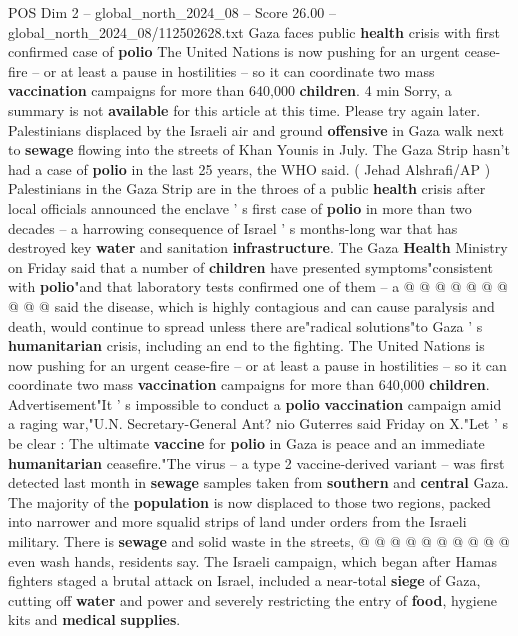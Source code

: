 \begin{textsample}{POS Dim 2 – global\_north\_2024\_08 – Score 26.00 – global\_north\_2024\_08/112502628.txt}  \label{ex:f2_pos_398}
Gaza faces public \textbf{health} crisis with first confirmed case of \textbf{polio} The United Nations is now pushing for an urgent cease-fire -- or at least a pause in hostilities -- so it can coordinate two mass \textbf{vaccination} campaigns for more than 640,000 \textbf{children}. 4 min Sorry, a summary is not \textbf{available} for this article at this time.
Please try again later.
Palestinians displaced by the Israeli air and ground \textbf{offensive} in Gaza walk next to \textbf{sewage} flowing into the streets of Khan Younis in July.
The Gaza Strip hasn't had a case of \textbf{polio} in the last 25 years, the WHO said. ( Jehad Alshrafi/AP ) Palestinians in the Gaza Strip are in the throes of a public \textbf{health} crisis after local officials announced the enclave ' s first case of \textbf{polio} in more than two decades -- a harrowing consequence of Israel ' s months-long war that has destroyed key \textbf{water} and sanitation \textbf{infrastructure}.
The Gaza \textbf{Health} Ministry on Friday said that a number of \textbf{children} have presented symptoms"consistent with \textbf{polio}"and that laboratory tests confirmed one of them -- a @ @ @ @ @ @ @ @ @ @ said the disease, which is highly contagious and can cause paralysis and death, would continue to spread unless there are"radical solutions"to Gaza ' s \textbf{humanitarian} crisis, including an end to the fighting.
The United Nations is now pushing for an urgent cease-fire -- or at least a pause in hostilities -- so it can coordinate two mass \textbf{vaccination} campaigns for more than 640,000 \textbf{children}.
Advertisement"It ' s impossible to conduct a \textbf{polio} \textbf{vaccination} campaign amid a raging war,"U.N.
Secretary-General Ant? nio Guterres said Friday on X."Let ' s be clear : The ultimate \textbf{vaccine} for \textbf{polio} in Gaza is peace and an immediate \textbf{humanitarian} ceasefire."The virus -- a type 2 vaccine-derived variant -- was first detected last month in \textbf{sewage} samples taken from \textbf{southern} and \textbf{central} Gaza.
The majority of the \textbf{population} is now displaced to those two regions, packed into narrower and more squalid strips of land under orders from the Israeli military.
There is \textbf{sewage} and solid waste in the streets, @ @ @ @ @ @ @ @ @ @ even wash hands, residents say.
The Israeli campaign, which began after Hamas fighters staged a brutal attack on Israel, included a near-total \textbf{siege} of Gaza, cutting off \textbf{water} and power and severely restricting the entry of \textbf{food}, hygiene kits and \textbf{medical} \textbf{supplies}.

\end{textsample}
